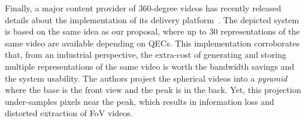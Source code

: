 

Finally, a major content provider of 360-degree videos has recently released details about the
implementation of its delivery platform~\cite{facebook}. The depicted system is based
on the same idea as our proposal, where up to 30 representations of the same video are available depending on
\acp{QEC}. This implementation corroborates that, from an industrial perspective, the
extra-cost of
generating and storing multiple representations of the same video is worth the bandwidth
savings and the system usability. The authors project the spherical videos into a \emph{pyramid}
where the
base is the front
view and the peak is in the back. Yet, this projection under-samples pixels near the peak,
which
results in
information loss and distorted extraction of \ac{FoV} videos. 

%
%
%
%


